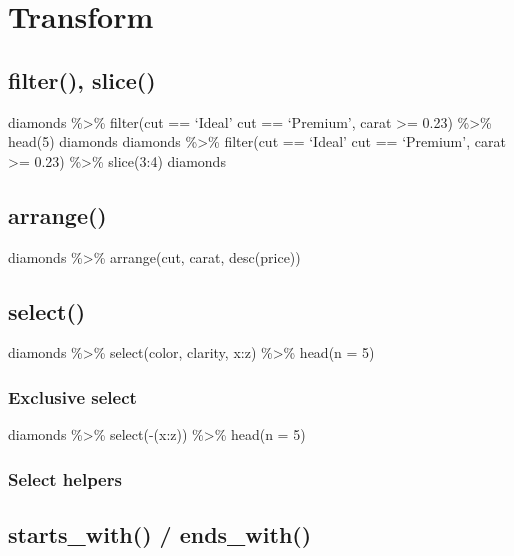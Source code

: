 \documentclass[
]{article}
\begin{document}
\hypertarget{transform}{%
\section{Transform}\label{transform}}

\hypertarget{filter-slice}{%
\subsection{filter(), slice()}\label{filter-slice}}

diamonds \%\textgreater\% filter(cut == `Ideal' \textbar{} cut ==
`Premium', carat \textgreater= 0.23) \%\textgreater\% head(5) diamonds
diamonds \%\textgreater\% filter(cut == `Ideal' \textbar{} cut ==
`Premium', carat \textgreater= 0.23) \%\textgreater\% slice(3:4)
diamonds

\hypertarget{arrange}{%
\subsection{arrange()}\label{arrange}}

diamonds \%\textgreater\% arrange(cut, carat, desc(price))

\hypertarget{select}{%
\subsection{select()}\label{select}}

diamonds \%\textgreater\% select(color, clarity, x:z) \%\textgreater\%
head(n = 5)

\hypertarget{exclusive-select}{%
\subsubsection{Exclusive select}\label{exclusive-select}}

diamonds \%\textgreater\% select(-(x:z)) \%\textgreater\% head(n = 5)

\hypertarget{select-helpers}{%
\subsubsection{Select helpers}\label{select-helpers}}

\hypertarget{starts_with-ends_with}{%
\subsection{starts\_with() / ends\_with()}\label{starts_with-ends_with}}
\end{document}
